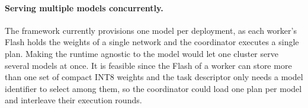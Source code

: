 
\paragraph{Serving multiple models concurrently.}
The framework currently provisions one model per deployment, as each worker's
Flash holds the weights of a single network and the coordinator executes a single plan.
Making the runtime agnostic to the model would let one cluster serve several models at once.
It is feasible since the Flash of a worker can store more than one set of compact INT8 weights and the task descriptor only needs a model identifier to select among them, so the coordinator could load one plan per model and interleave their execution rounds.